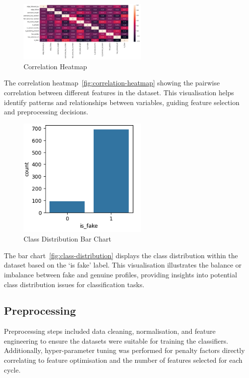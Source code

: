 \documentclass[conference]{IEEEtran}
\begin{document}
\begin{figure}[h]
	\begin{center}
		\includegraphics[width=2.5in]{correlation-heatmap}
		\caption{Correlation Heatmap}\label{fig:correlation-heatmap}
	\end{center}
\end{figure}

The correlation heatmap~\autoref{fig:correlation-heatmap} showing the pairwise correlation between different features in the dataset. This visualisation helps identify patterns and relationships between variables, guiding feature selection and preprocessing decisions.

\begin{figure}[h]
	\begin{center}
		\includegraphics[width=2.5in]{class-distribution}
		\caption{Class Distribution Bar Chart}\label{fig:class-distribution}
	\end{center}
\end{figure}

The bar chart~\autoref{fig:class-distribution} displays the class distribution within the dataset based on the `is fake' label. This visualisation illustrates the balance or imbalance between fake and genuine profiles, providing insights into potential class distribution issues for classification tasks.

\subsection{Preprocessing}

Preprocessing steps included data cleaning, normalisation, and feature engineering to ensure the datasets were suitable for training the classifiers. Additionally, hyper-parameter tuning was performed for penalty factors directly correlating to feature optimisation and the number of features selected for each cycle.
\end{document}
